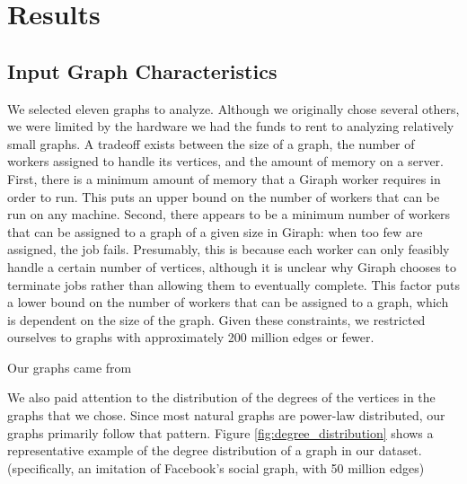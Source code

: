 \section{Results}
\label{sec:eval}

\subsection{Input Graph Characteristics}

We selected eleven graphs to analyze. Although we originally chose several 
others, we were limited by the hardware we had the funds to rent to analyzing 
relatively small graphs. A tradeoff exists between the size of a graph, the 
number of workers assigned to handle its vertices, and the amount of memory on 
a server. First, there is a minimum amount of memory that a Giraph worker 
requires in 
order to run. This puts an upper bound on the number of workers that can be run 
on any machine. Second, there appears to be a minimum number of workers that 
can be assigned to a graph of a given size in Giraph: when too few are 
assigned, the job fails. Presumably, this is because each worker can only 
feasibly handle a certain number of vertices, although it is unclear why Giraph 
chooses to terminate jobs rather than allowing them to eventually complete. 
This factor puts a lower bound on the number of workers that can be assigned to 
a graph, which is dependent on the size of the graph. Given these constraints, 
we restricted ourselves to graphs with approximately 200 million edges or fewer.

Our graphs came from 

We also paid attention to the distribution of the degrees of the vertices in 
the graphs that we chose. Since most natural graphs are power-law distributed, 
our graphs primarily follow that pattern. Figure \ref{fig:degree_distribution} 
shows a representative example of the degree distribution of a graph in our 
dataset.  (specifically, an imitation of Facebook's social graph, with 50 
million 
edges)

